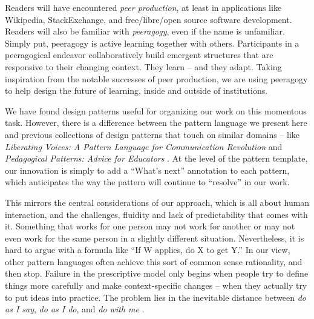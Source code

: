 \begin{refsection}
Readers will have encountered \emph{peer production}, at least in applications like Wikipedia, StackExchange, and free/libre/open source software development.   
%
Readers will also be familiar with \emph{peeragogy}, even if the name is unfamiliar.  Simply put, peeragogy is active learning together with others.  Participants in a peeragogical endeavor collaboratively build emergent structures that are responsive to their changing context. They learn -- and they adapt.
%
Taking inspiration from the notable successes of peer production, we are using peeragogy to help design the future of learning, inside and outside of institutions.

We have found design patterns useful for organizing our work on this momentous task.  However, there is a difference between the pattern language we present here and previous collections of design patterns that touch on similar domains -- like \emph{Liberating Voices: A Pattern Language for Communication Revolution} \cite{schuler2008liberating} and \emph{Pedagogical Patterns: Advice for Educators} \cite{bergin2012pedagogical}.  At the level of the pattern template, our innovation is simply to add a ``What's next'' annotation to each pattern, which anticipates the way the pattern will continue to ``resolve'' in our work. 


This mirrors the central considerations of our approach, which is all about human interaction, and the challenges, fluidity and lack of predictability that comes with it.  Something that works for one person may not work for another or may not even work for the same person in a slightly different situation.  Nevertheless, it is hard to argue with a formula like ``If W applies, do X to get Y.'' In our view, other pattern languages often achieve this sort of common sense rationality, and then stop.  Failure in the prescriptive model only begins when people try to define things more carefully and make context-specific changes -- when they actually try to put ideas into practice.  The problem lies in the inevitable distance between \emph{do as I say}, \emph{do as I do}, and \emph{do with me} \cite[p.~26]{deleuze1994difference}.


\end{refsection}
